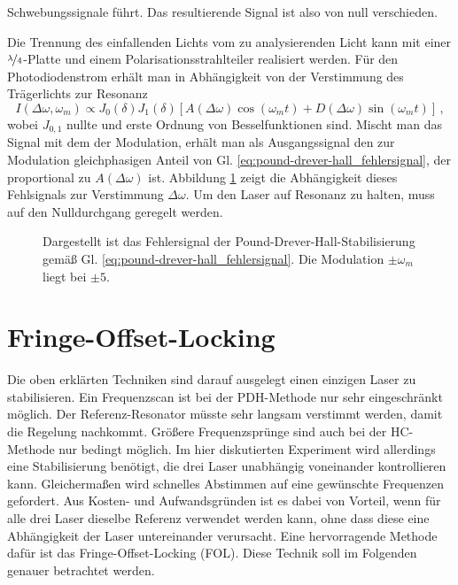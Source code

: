 Schwebungssignale führt. Das resultierende Signal ist also von null
verschieden.\par
Die Trennung des einfallenden Lichts vom zu analysierenden Licht kann mit einer
$\nicefrac{\lambda}{4}$-Platte und einem Polarisationsstrahlteiler realisiert
werden. Für den Photodiodenstrom erhält man in Abhängigkeit von der Verstimmung
des Trägerlichts zur Resonanz
\begin{equation}\label{eq:pound-drever-hall_fehlersignal}
	I(\Delta\omega,\omega_m)\propto
	J_0(\delta)J_1(\delta)\left[A(\Delta\omega)\cos{(\omega_mt)}+D(\Delta\omega)\sin{(\omega_mt)}\right]\,,
\end{equation}
wobei $J_{0,1}$ nullte und erste Ordnung von Besselfunktionen sind. Mischt man
das Signal mit dem der Modulation, erhält man als Ausgangssignal den zur
Modulation gleichphasigen Anteil von
Gl. \eqref{eq:pound-drever-hall_fehlersignal}, der proportional zu
$A(\Delta\omega)$ ist.
Abbildung \ref{fig:pound-drever-hall_fehlersignal} zeigt die Abhängigkeit dieses
Fehlsignals zur Verstimmung $\Delta\omega$. Um den Laser auf Resonanz zu halten,
muss auf den Nulldurchgang geregelt werden.
\begin{figure}[h]
	\centering
	\footnotesize
	
	\caption[Hänsch-Couillaud - Fehlersignal]{Dargestellt ist das Fehlersignal der
	Pound-Drever-Hall-Stabilisierung
	gemäß Gl.
	\eqref{eq:pound-drever-hall_fehlersignal}. Die Modulation 
	$\pm\omega_m$ liegt bei $\pm5$.}\label{fig:pound-drever-hall_fehlersignal}
\end{figure}

\section{Fringe-Offset-Locking}\label{sec:fringe-offset-locking}
Die oben erklärten Techniken sind darauf ausgelegt einen einzigen Laser zu
stabilisieren. Ein Frequenzscan ist bei der PDH-Methode nur sehr eingeschränkt
möglich. Der Referenz-Resonator müsste sehr langsam verstimmt werden, damit die
Regelung nachkommt. Größere Frequenzsprünge sind auch bei der HC-Methode
nur bedingt möglich. Im hier diskutierten Experiment wird allerdings eine
Stabilisierung benötigt, die drei Laser unabhängig voneinander kontrollieren
kann. Gleichermaßen wird schnelles Abstimmen auf eine gewünschte
Frequenzen gefordert. Aus Kosten- und Aufwandsgründen ist es dabei von Vorteil, wenn für alle drei Laser dieselbe
Referenz verwendet werden kann, ohne dass diese eine Abhängigkeit der Laser
untereinander verursacht. Eine hervorragende Methode dafür ist das
Fringe-Offset-Locking (FOL). Diese Technik soll im Folgenden genauer betrachtet
werden.

